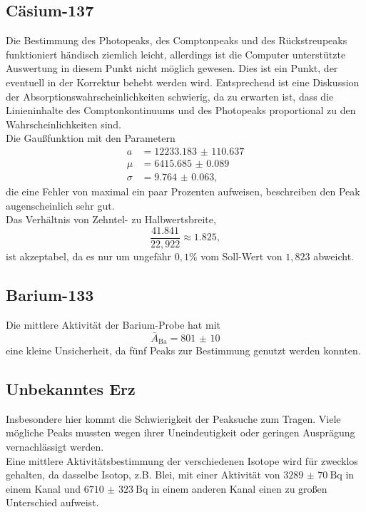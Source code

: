 \subsection{Cäsium-137}

Die Bestimmung des Photopeaks, des Comptonpeaks und des Rückstreupeaks funktioniert händisch ziemlich leicht, allerdings
ist die Computer unterstützte Auswertung in diesem Punkt nicht möglich gewesen. Dies ist ein Punkt, der eventuell in der Korrektur behebt werden wird.
Entsprechend ist eine Diskussion der Absorptionswahrscheinlichkeiten schwierig, da zu erwarten ist, dass die Linieninhalte des Comptonkontinuums und des Photopeaks proportional zu den Wahrscheinlichkeiten sind.\\

Die Gaußfunktion mit den Parametern
\begin{align}
    a &= \num{12233.183(110637)} \\
    \mu &= \num{6415.685(89)} \\
    \sigma &= \num{9.764(63)},
\end{align}
die eine Fehler von maximal ein paar Prozenten aufweisen, beschreiben den Peak augenscheinlich sehr gut. \\

Das Verhältnis von Zehntel- zu Halbwertsbreite,
\begin{equation}
    \frac{41.841}{22,922} \approx 1.825,
\end{equation}
ist akzeptabel, da es nur um ungefähr $0,1 \%$ vom Soll-Wert von $1,823$ abweicht.

\subsection{Barium-133}

Die mittlere Aktivität der Barium-Probe hat mit
\begin{equation}
    \bar{A}_\text{Ba} = \num{801(10)}
\end{equation}
eine kleine Unsicherheit, da fünf Peaks zur Bestimmung genutzt werden konnten.\\

\subsection{Unbekanntes Erz}

Insbesondere hier kommt die Schwierigkeit der Peaksuche zum Tragen. Viele mögliche Peaks mussten
wegen ihrer Uneindeutigkeit oder geringen Ausprägung vernachlässigt werden.\\

Eine mittlere Aktivitätsbestimmung der verschiedenen Isotope wird für zwecklos gehalten, da dasselbe Isotop, z.B. Blei, mit 
einer Aktivität von $\qty{3289(70)}{\becquerel}$ in einem Kanal und $\qty{6710(323)}{\becquerel}$ in einem anderen Kanal einen zu großen Unterschied aufweist.\\

